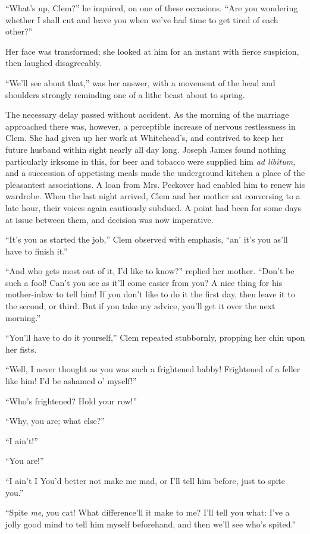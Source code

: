 ``What's up, Clem?'' he inquired, on one of these occasions. ``Are you
wondering whether I shall cut and leave you when we've had time to get
tired of each other?''

Her face was transformed; she looked at him for an instant with fierce
suspicion, then laughed disagreeably.

``We'll see about that,'' was her answer, with a movement of the head
and shoulders strongly reminding one of a lithe beast about to spring.

The necessary delay passed without accident. As the morning of the
marriage approached there was, however, a perceptible increase of
nervous restlessness in Clem. She had given up her work at Whitehead's,
and contrived to keep her future husband within sight nearly all day
long. Joseph James found nothing particularly irksome in this, for beer
and tobacco were supplied him \emph{ad libitum}, and a succession of
appetising {}meals made the underground kitchen a place of the
pleasantest associations. A loan from Mrs. Peckover had enabled him to
renew his wardrobe. When the last night arrived, Clem and her mother sat
conversing to a late hour, their voices again cautiously subdued. A
point had been for some days at issue between them, and decision was now
imperative.

``It's you as started the job,'' Clem observed with emphasis, ``an' it's
you as'll have to finish it.''

``And who gets most out of it, I'd like to know?'' replied her mother.
``Don't be such a fool! Can't you see as it'll come easier from you? A
nice thing for his mother-inlaw to tell him! If you don't like to do it
the first day, then leave it to the second, or third. But if you take my
advice, you'll get it over the next morning.''

``You'll have to do it yourself,'' Clem repeated stubbornly, propping
her chin upon her fists.

``Well, I never thought as you was such a {}frightened babby! Frightened
of a feller like him! I'd be ashamed o' myself!''

``Who's frightened? Hold your row!''

``Why, you are; what else?''

``I ain't!''

``You are!''

``I ain't I You'd better not make me mad, or I'll tell him before, just
to spite you.''

``Spite \emph{me}, you cat! What difference'll it make to me? I'll tell
you what: I've a jolly good mind to tell him myself beforehand, and then
we'll see who's spited.''

